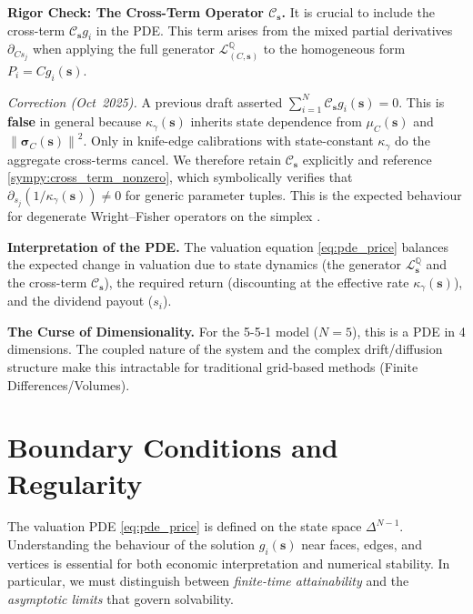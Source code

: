 \documentclass[11pt,letterpaper,oneside]{article}
\numberwithin{equation}{section}
\newcommand{\1}{\mathbf{1}}
\newcommand{\norm}[1]{\left\lVert #1\right\rVert}
\begin{document}
\begin{tcolorbox}[mathstyle]
    \textbf{Rigor Check: The Cross-Term Operator $\mathcal{C}_{\bm{s}}$.}
    It is crucial to include the cross-term $\mathcal{C}_{\bm{s}} g_i$ in the PDE. This term arises from the mixed partial derivatives $\partial_{C s_j}$ when applying the full generator $\mathcal{L}^{\mathbb{Q}}_{(C,\bm{s})}$ to the homogeneous form $P_i=C g_i(\bm{s})$.

    \emph{Correction (Oct~2025).} A previous draft asserted $\sum_{i=1}^N \mathcal{C}_{\bm{s}} g_i(\bm{s}) = 0$. This is \textbf{false} in general because $\kappa_\gamma(\bm{s})$ inherits state dependence from $\mu_C(\bm{s})$ and $\norm{\bm{\sigma}_C(\bm{s})}^2$. Only in knife-edge calibrations with state-constant $\kappa_\gamma$ do the aggregate cross-terms cancel. We therefore retain $\mathcal{C}_{\bm{s}}$ explicitly and reference \cref{sympy:cross_term_nonzero}, which symbolically verifies that $\partial_{s_j}(1/\kappa_\gamma(\bm{s})) \neq 0$ for generic parameter tuples. This is the expected behaviour for degenerate Wright--Fisher operators on the simplex \cite{epstein2013}.

\begin{tcolorbox}[didacticstyle]
  	\textbf{Interpretation of the PDE.} The valuation equation \eqref{eq:pde_price} balances the expected change in valuation due to state dynamics (the generator $\mathcal{L}^{\mathbb{Q}}_{\bm{s}}$ and the cross-term $\mathcal{C}_{\bm{s}}$), the required return (discounting at the effective rate $\kappa_\gamma(\bm{s})$), and the dividend payout ($s_i$).

\begin{tcolorbox}[mathstyle]
    \textbf{The Curse of Dimensionality.} For the 5-5-1 model ($N=5$), this is a PDE in 4 dimensions. The coupled nature of the system and the complex drift/diffusion structure make this intractable for traditional grid-based methods (Finite Differences/Volumes).

\end{tcolorbox}
\end{tcolorbox}
\end{tcolorbox}

\section{Boundary Conditions and Regularity}
\label{sec:boundaries}
The valuation PDE \eqref{eq:pde_price} is defined on the state space $\Delta^{N-1}$. Understanding the behaviour of the solution $g_i(\bm{s})$ near faces, edges, and vertices is essential for both economic interpretation and numerical stability. In particular, we must distinguish between \emph{finite-time attainability} and the \emph{asymptotic limits} that govern solvability.
\end{document}
